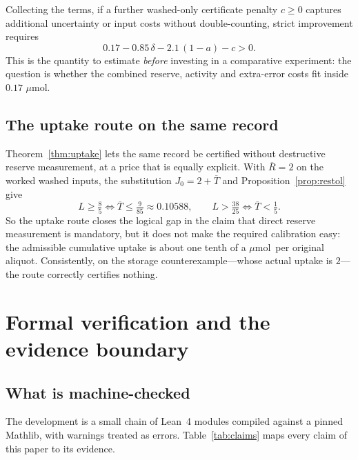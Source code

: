 \documentclass[11pt]{article}
\theoremstyle{plain}
\theoremstyle{definition}
\theoremstyle{remark}
\newcommand{\mumol}{\ensuremath{\mu\mathrm{mol}}}
\newcommand{\Lc}{L}
\begin{document}
Collecting the terms, if a further washed-only certificate penalty $c\ge0$
captures additional uncertainty or input costs without double-counting, strict
improvement requires
\begin{equation}
 0.17-0.85\,\delta-2.1\,(1-a)-c>0 .
 \label{eq:budget}
\end{equation}
This is the quantity to estimate \emph{before} investing in a comparative
experiment: the question is whether the combined reserve, activity and
extra-error costs fit inside $0.17$ \mumol.

\subsection{The uptake route on the same record}

Theorem~\ref{thm:uptake} lets the same record be certified without destructive
reserve measurement, at a price that is equally explicit. With
$\overline R=2$ on the worked washed inputs, the substitution
$J_0=2+\overline T$ and Proposition~\ref{prop:restol} give
\[
 \Lc\ge\tfrac85\iff \overline T\le\tfrac9{85}\approx0.10588,
 \qquad
 \Lc>\tfrac{38}{25}\iff \overline T<\tfrac15 .
\]
So the uptake route closes the logical gap in the claim that direct reserve
measurement is mandatory, but it does not make the required calibration easy:
the admissible cumulative uptake is about one tenth of a \mumol\ per original
aliquot. Consistently, on the storage counterexample---whose actual uptake is
$2$---the route correctly certifies nothing.

\section{Formal verification and the evidence boundary}\label{sec:evidence}

\subsection{What is machine-checked}

The development is a small chain of Lean~4 modules compiled against a pinned
Mathlib, with warnings treated as errors. Table~\ref{tab:claims} maps every
claim of this paper to its evidence.
\end{document}
